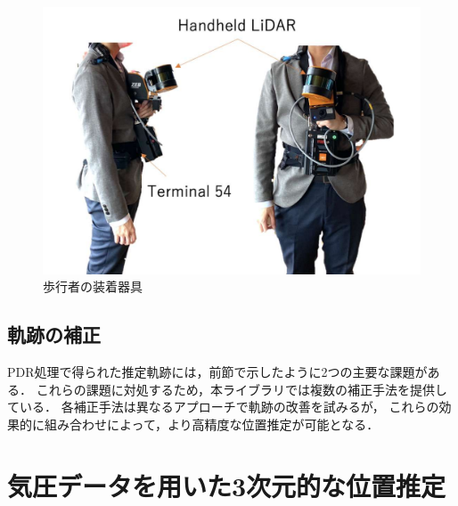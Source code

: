 \begin{figure}[ht]
	\centering
	\includegraphics[width=\linewidth]{../image/lidar.pdf}
	\caption{歩行者の装着器具}    \label{fig:device}
\end{figure}






\subsection{軌跡の補正}

PDR処理で得られた推定軌跡には，前節で示したように2つの主要な課題がある．
これらの課題に対処するため，本ライブラリでは複数の補正手法を提供している．
各補正手法は異なるアプローチで軌跡の改善を試みるが，
これらの効果的に組み合わせによって，より高精度な位置推定が可能となる．








\section{気圧データを用いた3次元的な位置推定}



